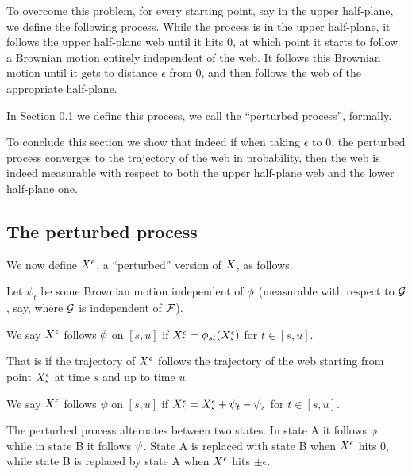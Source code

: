 {To overcome this problem, for every starting point, say in the upper
half-plane, we define the following process. While the process is in
the upper half-plane, it follows the upper half-plane web until it hits
$0$, at which point it starts to follow a Brownian motion entirely
independent of the web. It follows this Brownian motion until it gets
to distance $\epsilon$ from 0, and then follows the web of the appropriate
half-plane.

In Section \ref{subsec:the-perturbed-process} we define this process, we call the
``perturbed process'', formally.

To conclude this section we show that indeed if when taking $\epsilon$
to 0, the perturbed process converges to the trajectory of
the web in probability, then the web is indeed measurable with respect
to both the upper half-plane web and the lower half-plane one.

\subsection{The perturbed process}
\label{subsec:the-perturbed-process}

{
\newcommand{\joinernoargs}{\psi}
\newcommand{\joiner}[2]{\joinernoargs_{{#1}{#2}}}
\newcommand{\joinerval}[1]{\joinernoargs_{#1}}
\begin{definition}
  \label{def:resamplede}
  We now define $X^{\epsilon}$, a ``perturbed'' version of $X$, as
  follows.

  Let $\joinerval{t}$ be
  some Brownian motion independent of $\phi$ (measurable with
  respect to $\mathcal{G}$, say, where $\mathcal{G}$ is independent of
  $\mathcal{F}$).

  We say $X^{\epsilon}$ follows $\phi$ on $[s,u]$ if
  $X^{\epsilon}_t = \phi_{{s}{t}}(X^{\epsilon}_s)$ for $t \in [s,u]$.

  That is if the trajectory of $X^{\epsilon}$ follows the trajectory of
  the web starting from point $X^{\epsilon}_s$ at time $s$ and up to time $u$.

  We say $X^{\epsilon}$ follows $\joinernoargs$ on $[s,u]$ if
  $\resamplede_t = \resamplede_s + \joinerval{t} - \joinerval{s}$ for $t \in [s,u]$.

  The perturbed process alternates between two states.  In state A it follows
  $\phi$ while in state B it follows $\psi$. State A is replaced with state B
  when $X^{\epsilon}$ hits $0$, while state B is replaced by state A when
  $X^{\epsilon}$ hits $\pm \epsilon$.
\end{definition}
}

}
